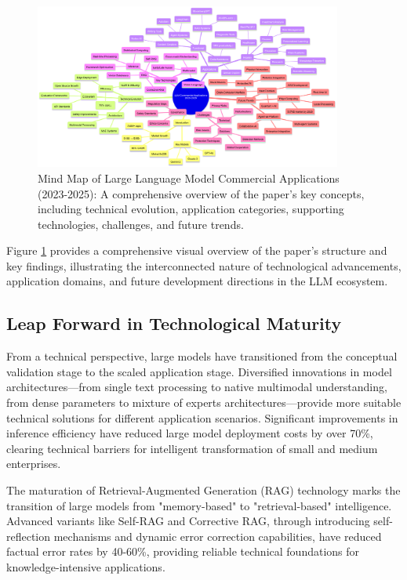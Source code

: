 \documentclass{article}
\begin{document}
\begin{figure}[htbp]
\centering
\includegraphics[width=0.9\textwidth]{mindmap.png}
\caption{Mind Map of Large Language Model Commercial Applications (2023-2025): A comprehensive overview of the paper's key concepts, including technical evolution, application categories, supporting technologies, challenges, and future trends.}
\label{fig:mindmap}
\end{figure}

Figure \ref{fig:mindmap} provides a comprehensive visual overview of the paper's structure and key findings, illustrating the interconnected nature of technological advancements, application domains, and future development directions in the LLM ecosystem.

\subsection{Leap Forward in Technological Maturity}
From a technical perspective, large models have transitioned from the conceptual validation stage to the scaled application stage. Diversified innovations in model architectures—from single text processing to native multimodal understanding, from dense parameters to mixture of experts architectures—provide more suitable technical solutions for different application scenarios. Significant improvements in inference efficiency have reduced large model deployment costs by over 70\%, clearing technical barriers for intelligent transformation of small and medium enterprises.

The maturation of Retrieval-Augmented Generation (RAG) technology marks the transition of large models from "memory-based" to "retrieval-based" intelligence. Advanced variants like Self-RAG and Corrective RAG, through introducing self-reflection mechanisms and dynamic error correction capabilities, have reduced factual error rates by 40-60\%, providing reliable technical foundations for knowledge-intensive applications.
\end{document}
